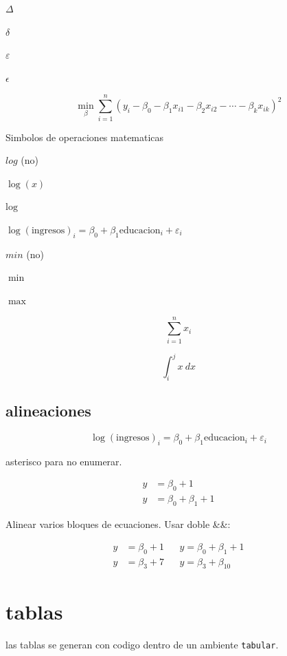 \documentclass{article}
\begin{document}
$\Delta$

$\delta$

$\varepsilon$

$\epsilon$

\begin{equation}
  \min_{\beta} \sum_{i=1}^{n} (y_i - \beta_0 - \beta_1 x_{i1} - \beta_2 x_{i2} - \cdots - \beta_k x_{ik})^2
  \label{eq:ols_optimization}
\end{equation}

Simbolos de operaciones matematicas

$log$ (no)

$\log(x)$

$\text{log}$

$\log(\text{ingresos})_i = \beta_0 + \beta_1 \text{educacion}_i + \varepsilon_i$

$min$ (no)

$\min$

$\max$

$$\displaystyle \sum_{i=1}^n x_i$$

$$\displaystyle \int_i^j x \ dx$$

\subsection{alineaciones}

\begin{equation*}
    \log(\text{ingresos})_i = \beta_0 + \beta_1 \text{educacion}_i + \varepsilon_i
\end{equation*}

asterisco para no enumerar. 

\begin{align*}
    y &= \beta_0 + 1 \\
    y &= \beta_0 + \beta_1 + 1 
\end{align*}

Alinear varios bloques de ecuaciones. Usar doble \&\&:

\begin{align*}
    y &= \beta_0 + 1 && y = \beta_0 + \beta_1 + 1 \\
    y &= \beta_3 + 7 && y= \beta_3 + \beta_{10}
\end{align*}

\section{tablas}

las tablas se generan con codigo dentro de un ambiente \texttt{tabular}.
\end{document}
